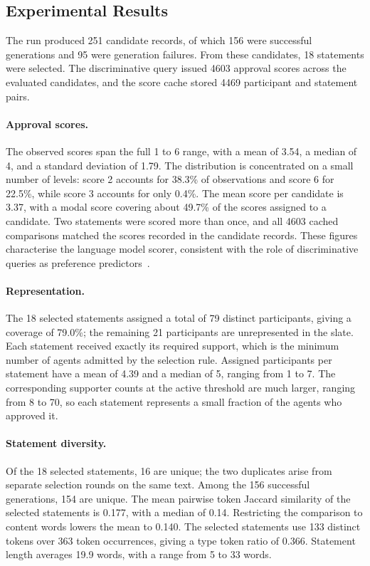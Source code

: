 \documentclass[letterpaper,11pt]{article}
\theoremstyle{plain}
\theoremstyle{definition}
\begin{document}
\subsection{Experimental Results}

The run produced 251 candidate records, of which 156 were successful generations and 95 were generation failures. From these candidates, 18 statements were selected. The discriminative query issued 4603 approval scores across the evaluated candidates, and the score cache stored 4469 participant and statement pairs.

\paragraph{Approval scores.}
The observed scores span the full 1 to 6 range, with a mean of 3.54, a median of 4, and a standard deviation of 1.79. The distribution is concentrated on a small number of levels: score 2 accounts for 38.3\% of observations and score 6 for 22.5\%, while score 3 accounts for only 0.4\%. The mean score per candidate is 3.37, with a modal score covering about 49.7\% of the scores assigned to a candidate. Two statements were scored more than once, and all 4603 cached comparisons matched the scores recorded in the candidate records. These figures characterise the language model scorer, consistent with the role of discriminative queries as preference predictors~\citep{fish2026gsc,boehmer2025nextgen}.

\paragraph{Representation.}
The 18 selected statements assigned a total of 79 distinct participants, giving a coverage of 79.0\%; the remaining 21 participants are unrepresented in the slate. Each statement received exactly its required support, which is the minimum number of agents admitted by the selection rule. Assigned participants per statement have a mean of 4.39 and a median of 5, ranging from 1 to 7. The corresponding supporter counts at the active threshold are much larger, ranging from 8 to 70, so each statement represents a small fraction of the agents who approved it.

\paragraph{Statement diversity.}
Of the 18 selected statements, 16 are unique; the two duplicates arise from separate selection rounds on the same text. Among the 156 successful generations, 154 are unique. The mean pairwise token Jaccard similarity of the selected statements is 0.177, with a median of 0.14. Restricting the comparison to content words lowers the mean to 0.140. The selected statements use 133 distinct tokens over 363 token occurrences, giving a type token ratio of 0.366. Statement length averages 19.9 words, with a range from 5 to 33 words.
\end{document}
